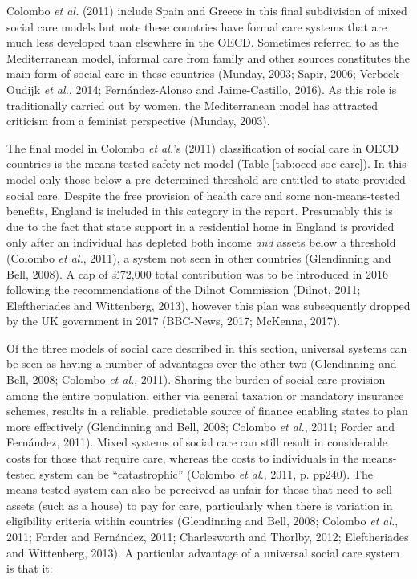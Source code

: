 \documentclass[12pt,a4paper,oneside,table]{report}
\begin{document}
Colombo \textit{et al.} (2011) include Spain and Greece in this final
subdivision of mixed social care models but note these countries have
formal care systems that are much less developed than elsewhere in the
OECD. Sometimes referred to as the Mediterranean model, informal care
from family and other sources constitutes the main form of social care
in these countries (Munday, 2003; Sapir, 2006; Verbeek-Oudijk \emph{et
al.}, 2014; Fernández-Alonso and Jaime-Castillo, 2016). As this role is
traditionally carried out by women, the Mediterranean model has
attracted criticism from a feminist perspective (Munday, 2003).

The final model in Colombo \textit{et al.}'s (2011) classification of
social care in OECD countries is the means-tested safety net model
(Table \ref{tab:oecd-soc-care}). In this model only those below a
pre-determined threshold are entitled to state-provided social care.
Despite the free provision of health care and some non-means-tested
benefits, England is included in this category in the report. Presumably
this is due to the fact that state support in a residential home in
England is provided only after an individual has depleted both income
\textit{and} assets below a threshold (Colombo \emph{et al.}, 2011), a
system not seen in other countries (Glendinning and Bell, 2008). A cap
of £72,000 total contribution was to be introduced in 2016 following the
recommendations of the Dilnot Commission (Dilnot, 2011; Eleftheriades
and Wittenberg, 2013), however this plan was subsequently dropped by the
UK government in 2017 (BBC-News, 2017; McKenna, 2017).

Of the three models of social care described in this section, universal
systems can be seen as having a number of advantages over the other two
(Glendinning and Bell, 2008; Colombo \emph{et al.}, 2011). Sharing the
burden of social care provision among the entire population, either via
general taxation or mandatory insurance schemes, results in a reliable,
predictable source of finance enabling states to plan more effectively
(Glendinning and Bell, 2008; Colombo \emph{et al.}, 2011; Forder and
Fernández, 2011). Mixed systems of social care can still result in
considerable costs for those that require care, whereas the costs to
individuals in the means-tested system can be ``catastrophic'' (Colombo
\emph{et al.}, 2011, p. pp240). The means-tested system can also be
perceived as unfair for those that need to sell assets (such as a house)
to pay for care, particularly when there is variation in eligibility
criteria within countries (Glendinning and Bell, 2008; Colombo \emph{et
al.}, 2011; Forder and Fernández, 2011; Charlesworth and Thorlby, 2012;
Eleftheriades and Wittenberg, 2013). A particular advantage of a
universal social care system is that it:
\end{document}
